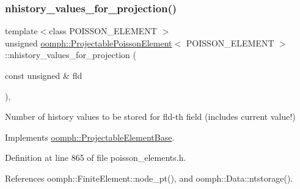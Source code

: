 \mbox{\label{classoomph_1_1ProjectablePoissonElement_a6256481549383c8abdd666f691e3dbed}} 
\subsubsection{\texorpdfstring{nhistory\+\_\+values\+\_\+for\+\_\+projection()}{nhistory\_values\_for\_projection()}}
{\footnotesize\ttfamily template$<$class P\+O\+I\+S\+S\+O\+N\+\_\+\+E\+L\+E\+M\+E\+NT $>$ \\
unsigned \hyperlink{classoomph_1_1ProjectablePoissonElement}{oomph\+::\+Projectable\+Poisson\+Element}$<$ P\+O\+I\+S\+S\+O\+N\+\_\+\+E\+L\+E\+M\+E\+NT $>$\+::nhistory\+\_\+values\+\_\+for\+\_\+projection (\begin{DoxyParamCaption}\item[{const unsigned \&}]{fld }\end{DoxyParamCaption})\hspace{0.3cm}{\ttfamily [inline]}, {\ttfamily [virtual]}}



Number of history values to be stored for fld-\/th field (includes current value!) 



Implements \hyperlink{classoomph_1_1ProjectableElementBase_ac6790f394630b964663281f8740f43a5}{oomph\+::\+Projectable\+Element\+Base}.



Definition at line 865 of file poisson\+\_\+elements.\+h.



References oomph\+::\+Finite\+Element\+::node\+\_\+pt(), and oomph\+::\+Data\+::ntstorage().

\mbox{\label{classoomph_1_1ProjectablePoissonElement_a006f46a3072037df9f301ed71af56ac1}} 
